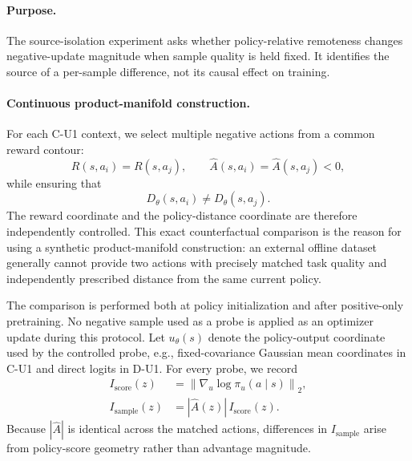 \documentclass[sigconf,anonymous,review]{acmart}
\theoremstyle{acmdefinition}
\begin{document}
\paragraph{Purpose.}
The source-isolation experiment asks whether policy-relative remoteness
changes negative-update magnitude when sample quality is held fixed. It
identifies the source of a per-sample difference, not its causal effect on
training.

\paragraph{Continuous product-manifold construction.}
For each C-U1 context, we select multiple negative actions from a common
reward contour:
\begin{equation}
    R(s,a_i)
    =
    R(s,a_j),
    \qquad
    \widehat A(s,a_i)
    =
    \widehat A(s,a_j)
    <0,
    \label{eq:source_equal_quality}
\end{equation}
while ensuring that
\begin{equation}
    D_\theta(s,a_i)
    \neq
    D_\theta(s,a_j).
    \label{eq:source_different_remoteness}
\end{equation}
The reward coordinate and the policy-distance coordinate are therefore
independently controlled. This exact counterfactual comparison is the
reason for using a synthetic product-manifold construction: an external
offline dataset generally cannot provide two actions with precisely
matched task quality and independently prescribed distance from the
same current policy.

The comparison is performed both at policy initialization and after
positive-only pretraining. No negative sample used as a probe is applied
as an optimizer update during this protocol. Let \(u_\theta(s)\) denote
the policy-output coordinate used by the controlled probe, e.g.,
fixed-covariance Gaussian mean coordinates in C-U1 and direct logits in
D-U1. For every probe, we record
\begin{equation}
\begin{aligned}
I_{\mathrm{score}}(z)
&=
\left\|
\nabla_{u}\log \pi_{u}(a\mid s)
\right\|_2,\\
I_{\mathrm{sample}}(z)
&=
|\widehat A(z)|\, I_{\mathrm{score}}(z).
\end{aligned}
\label{eq:source_influence_metrics}
\end{equation}
Because \(|\widehat A|\) is identical across the matched actions,
differences in \(I_{\mathrm{sample}}\) arise from policy-score geometry
rather than advantage magnitude.
\end{document}
